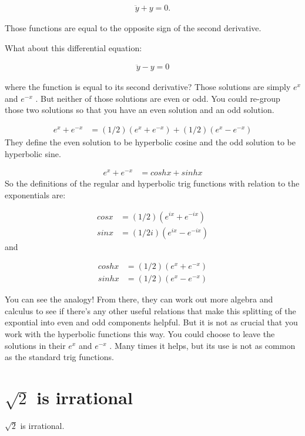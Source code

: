 \begin{align*}
  \ddot{y} + y = 0.
\end{align*}

Those functions are equal to the opposite sign of the second
derivative.

What about this differential equation:

\begin{align*}
  \ddot{y} - y = 0
\end{align*}

where the function is equal to its second derivative? Those solutions are simply $e^x$ and $e^{-x}$
. But neither of those solutions are even or odd. You could re-group those two solutions so that you
have an even solution and an odd solution.

\begin{align*}
e^x + e^{-x} &= (1/2) (e^x + e^{-x} ) + (1/2) (e^x - e^{-x} )
\end{align*}
They define the even solution to be hyperbolic cosine and the odd solution to be hyperbolic sine.

\begin{align*}
e^x + e^{-x} &= cosh x + sinh x
\end{align*}
So the definitions of the regular and hyperbolic trig functions with relation to the exponentials
are:

\begin{align*}
cos x &= (1/2) ( e^{ix} + e^{-ix} ) \\
sin x &= (1/2i) ( e^{ix} - e^{-ix} )
\end{align*}
and

\begin{align*}
cosh x &= (1/2) ( e^x + e^{-x} ) \\
sinh x &= (1/2) ( e^x - e^{-x} )
\end{align*}

You can see the analogy! From there, they can work out more algebra and calculus to see if there's
any other useful relations that make this splitting of the expontial into even and odd components
helpful. But it is not as crucial that you work with the hyperbolic functions this way. You could
choose to leave the solutions in their $e^{x}$ and $e^{-x}$ . Many times it helps, but its use is
not as common as the standard trig functions.



\section{$\sqrt{2}$ is irrational}
\begin{theorem*}
  $\sqrt{2}$ is irrational.
\end{theorem*}


